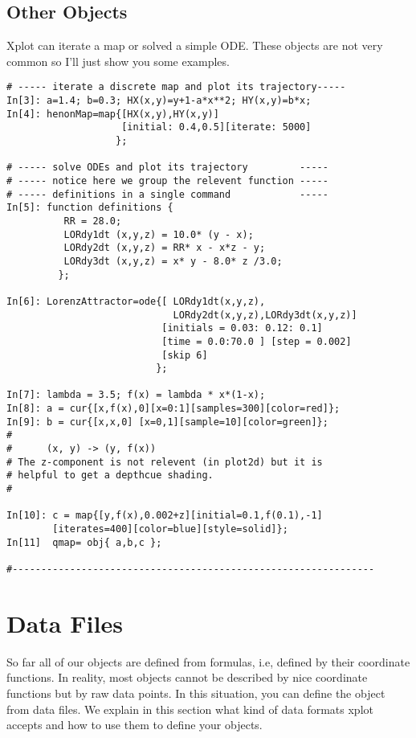 \subsection{Other Objects}
Xplot can iterate a map or solved a simple ODE. These objects are
not very common so I'll just show you some examples.
\begin{verbatim}
# ----- iterate a discrete map and plot its trajectory-----
In[3]: a=1.4; b=0.3; HX(x,y)=y+1-a*x**2; HY(x,y)=b*x;
In[4]: henonMap=map{[HX(x,y),HY(x,y)] 
                    [initial: 0.4,0.5][iterate: 5000]
                   };

# ----- solve ODEs and plot its trajectory         -----
# ----- notice here we group the relevent function -----
# ----- definitions in a single command            -----
In[5]: function definitions {
          RR = 28.0;
          LORdy1dt (x,y,z) = 10.0* (y - x);
          LORdy2dt (x,y,z) = RR* x - x*z - y;
          LORdy3dt (x,y,z) = x* y - 8.0* z /3.0;
         };

In[6]: LorenzAttractor=ode{[ LORdy1dt(x,y,z),
                             LORdy2dt(x,y,z),LORdy3dt(x,y,z)] 
                           [initials = 0.03: 0.12: 0.1]
                           [time = 0.0:70.0 ] [step = 0.002]
                           [skip 6] 
                          };

In[7]: lambda = 3.5; f(x) = lambda * x*(1-x);
In[8]: a = cur{[x,f(x),0][x=0:1][samples=300][color=red]}; 
In[9]: b = cur{[x,x,0] [x=0,1][sample=10][color=green]}; 
#
#      (x, y) -> (y, f(x))
# The z-component is not relevent (in plot2d) but it is
# helpful to get a depthcue shading.
#

In[10]: c = map{[y,f(x),0.002+z][initial=0.1,f(0.1),-1]      
	 	[iterates=400][color=blue][style=solid]};
In[11]  qmap= obj{ a,b,c };

#---------------------------------------------------------------

\end{verbatim}

\section{Data Files}
So far all of our objects are defined from formulas, i.e,
defined by their coordinate functions. In reality, most
objects cannot be described by nice coordinate 
functions but by raw data points. In this situation,
you can define the object from data files. We explain
in this section what kind of data formats { xplot}
accepts and how to use them to define your objects. 

